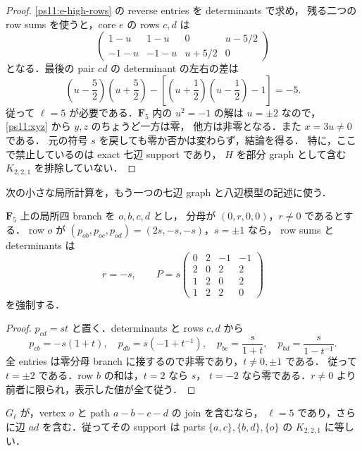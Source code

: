 \begin{proof}
\eqref{ps11:e-high-rows} の reverse entries を determinants で求め，
残る二つの row sums を使うと，core $e$ の rows $c,d$ は
\[
 \begin{pmatrix}
 1-u&1-u&0&u-5/2\\
 -1-u&-1-u&u+5/2&0
 \end{pmatrix}
\]
となる．最後の pair $cd$ の determinant の左右の差は
\begin{equation}\label{ps11:five-residual}
 \left(u-\frac52\right)\left(u+\frac52\right)
 -\left[\left(u+\frac12\right)\left(u-\frac12\right)-1\right]
 =-5.
\end{equation}
従って $\ell=5$ が必要である．$\mathbf F_5$ 内の $u^2=-1$ の解は
$u=\pm2$ なので，\eqref{ps11:xyz} から $y,z$ のちょうど一方は零，
他方は非零となる．また $x=3u\ne0$ である．
元の符号 $s$ を戻しても零か否かは変わらず，結論を得る．
特に，ここで禁止しているのは exact 七辺 support であり，
$H$ を部分 graph として含む $K_{2,2,1}$ を排除していない．
\end{proof}

次の小さな局所計算を，もう一つの七辺 graph と八辺模型の記述に使う．

\begin{lemma}[三つの零分母を持つ局所合同模型]\label{ps11:three-zero}
$\mathbf F_5$ 上の局所四 branch を $o,b,c,d$ とし，
分母が $(0,r,0,0)$，$r\ne0$ であるとする．
row $o$ が $(p_{ob},p_{oc},p_{od})=(2s,-s,-s)$，$s=\pm1$ なら，
row sums と determinants は
\begin{equation}\label{ps11:outer-matrix}
 r=-s,\qquad
 P=s\begin{pmatrix}
 0&2&-1&-1\\
 2&0&2&2\\
 1&2&0&2\\
 1&2&2&0
 \end{pmatrix}
\end{equation}
を強制する．
\end{lemma}

\begin{proof}
$p_{cd}=st$ と置く．determinants と rows $c,d$ から
\[
 p_{cb}=-s(1+t),\quad p_{db}=s(-1+t^{-1}),\quad
 p_{bc}=\frac{s}{1+t},\quad p_{bd}=\frac{s}{1-t^{-1}}.
\]
全 entries は零分母 branch に接するので非零であり，$t\ne0,\pm1$ である．
従って $t=\pm2$ である．row $b$ の和は，$t=2$ なら $s$，
$t=-2$ なら零である．$r\ne0$ より前者に限られ，表示した値が全て従う．
\end{proof}

\begin{lemma}\label{ps11:path-completion}
$G_\ell$ が，vertex $o$ と path $a-b-c-d$ の join を含むなら，
$\ell=5$ であり，さらに辺 $ad$ を含む．従ってその support は
parts $\{a,c\},\{b,d\},\{o\}$ の $K_{2,2,1}$ に等しい．
\end{lemma}

